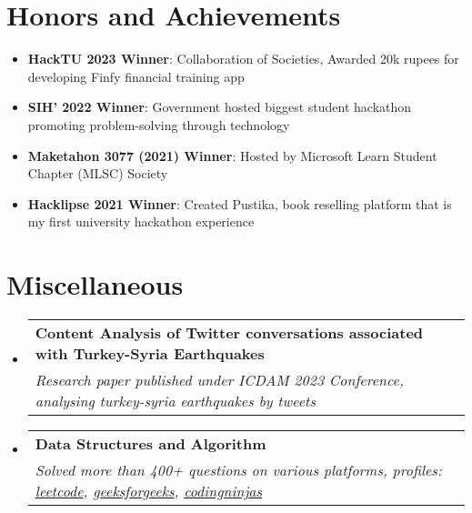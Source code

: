 \documentclass[letterpaper,11pt]{article}
\makeatletter
\newcommand{\resumeItem}[2]{
  \item\small{
    \textbf{#1}{: #2 \vspace{-2pt}}
  }
}
\newcommand{\resumeSubheading}[4]{
  \vspace{-1pt}\item
    \begin{tabular*}{0.97\textwidth}[t]{l@{\extracolsep{\fill}}r}
      \textbf{#1} & #2 \\
      \textit{\small#3} & \textit{\small #4} \\
    \end{tabular*}\vspace{-5pt}
}
\newcommand{\resumeSubItem}[2]{\resumeItem{#1}{#2}\vspace{-4pt}}
\newcommand{\resumeSubHeadingListStart}{\begin{itemize}[leftmargin=*]}
\newcommand{\resumeSubHeadingListEnd}{\end{itemize}}
\makeatother
\begin{document}
\section{Honors and Achievements}
  \resumeSubHeadingListStart
      \resumeSubItem{HackTU 2023 Winner}
      {Collaboration of Societies, Awarded 20k rupees for developing Finfy financial training app}
      \resumeSubItem{SIH' 2022 Winner}
      {Government hosted biggest student hackathon promoting problem-solving through technology}
      \resumeSubItem{Maketahon 3077 (2021) Winner}
      {Hosted by Microsoft Learn Student Chapter (MLSC) Society}
      \resumeSubItem{Hacklipse 2021 Winner}
      {Created Pustika, book reselling platform that is my first university hackathon experience}


  \resumeSubHeadingListEnd


\section{Miscellaneous}
\resumeSubHeadingListStart
\resumeSubheading
{Content Analysis of Twitter conversations associated with Turkey-Syria Earthquakes}{}
{Research paper published under ICDAM 2023 Conference, analysing turkey-syria earthquakes by tweets}{}

\resumeSubheading
{Data Structures and Algorithm}{}
{Solved more than 400+ questions on various platforms, profiles: \href{https://leetcode.com/hskleetcode/}{leetcode}, \href{https://auth.geeksforgeeks.org/user/hari01584}{geeksforgeeks}, \href{https://www.codingninjas.com/studio/profile/Harishankar}{codingninjas}}{}
\resumeSubHeadingListEnd


\end{document}
